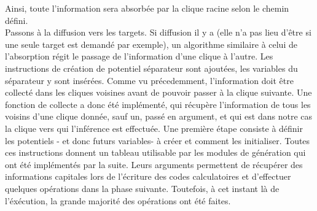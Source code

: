 \documentclass[a4paper]{article}
\begin{document}
Ainsi, toute l'information sera absorbée par la clique racine selon le chemin défini. \\
Passons à la diffusion vers les targets. Si diffusion il y a (elle n'a pas lieu d'être si une seule target est demandé par exemple), un algorithme similaire à celui de l'absorption régit le passage de l'information
d'une clique à l'autre. Les instructions de création de potentiel séparateur sont ajoutées, les variables du séparateur y sont insérées. Comme vu précedemment, l'information doit être collecté dans les cliques
voisines avant de pouvoir passer à la clique suivante. Une fonction de collecte a donc été implémenté, qui récupère l'information de tous les voisins d'une clique donnée, sauf un, passé en argument, et qui est
dans notre cas la clique vers qui l'inférence est effectuée.
Une première étape consiste à définir les potentiels - et donc futurs variables- à créer et comment les initialiser.
Toutes ces instructions donnent un tableau utilisable par les modules de génération qui ont été implémentés par la suite. Leurs arguments permettent de récupérer des informations capitales lors de l'écriture
des codes calculatoires et d'effectuer quelques opérations dans la phase suivante. Toutefois, à cet instant là de l'éxécution, la grande majorité des opérations ont été faites. \\
\end{document}
